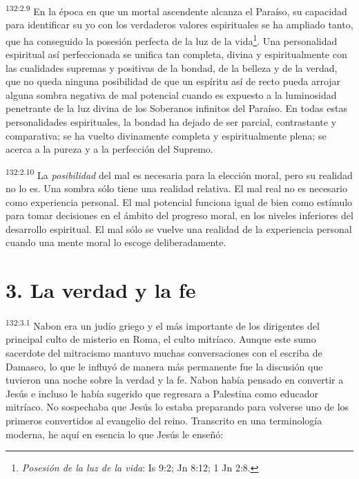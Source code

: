 \par
\textsuperscript{132:2.9} En la época en que un mortal ascendente alcanza el Paraíso, su capacidad para identificar su yo con los verdaderos valores espirituales se ha ampliado tanto, que ha conseguido la posesión perfecta de la luz de la vida\footnote{\textit{Posesión de la luz de la vida}: Is 9:2; Jn 8:12; 1 Jn 2:8.}. Una personalidad espiritual así perfeccionada se unifica tan completa, divina y espiritualmente con las cualidades supremas y positivas de la bondad, de la belleza y de la verdad, que no queda ninguna posibilidad de que un espíritu así de recto pueda arrojar alguna sombra negativa de mal potencial cuando es expuesto a la luminosidad penetrante de la luz divina de los Soberanos infinitos del Paraíso. En todas estas personalidades espirituales, la bondad ha dejado de ser parcial, contrastante y comparativa; se ha vuelto divinamente completa y espiritualmente plena; se acerca a la pureza y a la perfección del Supremo.

\par
\textsuperscript{132:2.10} La \textit{posibilidad} del mal es necesaria para la elección moral, pero su realidad no lo es. Una sombra sólo tiene una realidad relativa. El mal real no es necesario como experiencia personal. El mal potencial funciona igual de bien como estímulo para tomar decisiones en el ámbito del progreso moral, en los niveles inferiores del desarrollo espiritual. El mal sólo se vuelve una realidad de la experiencia personal cuando una mente moral lo escoge deliberadamente.

\section*{3. La verdad y la fe}
\par
\textsuperscript{132:3.1} Nabon era un judío griego y el más importante de los dirigentes del principal culto de misterio en Roma, el culto mitríaco. Aunque este sumo sacerdote del mitracismo mantuvo muchas conversaciones con el escriba de Damasco, lo que le influyó de manera más permanente fue la discusión que tuvieron una noche sobre la verdad y la fe. Nabon había pensado en convertir a Jesús e incluso le había sugerido que regresara a Palestina como educador mitríaco. No sospechaba que Jesús lo estaba preparando para volverse uno de los primeros convertidos al evangelio del reino. Transcrito en una terminología moderna, he aquí en esencia lo que Jesús le enseñó:

